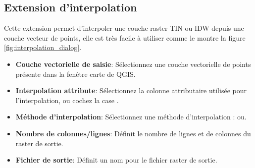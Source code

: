 
%
%

\subsection{Extension d'interpolation}

Cette extension permet d'interpoler une couche raster TIN ou IDW depuis une couche vecteur de points, elle est tr\`es facile \`a utiliser comme le montre la figure \ref{fig:interpolation_dialog}.


\begin{itemize}
\item \textbf{Couche vectorielle de saisie}: S\'electionnez une couche vectorielle de points pr\'esente dans la fen\^etre carte de QGIS.
\item \textbf{Interpolation attribute}: S\'electionnez la colonne attributaire utilis\'ee pour l'interpolation, ou 
cochez la case .
\item \textbf{M\'ethode d'interpolation}: S\'electionnez une m\'ethode d'interpolation :  ou.
\item \textbf{Nombre de colonnes/lignes}: D\'efinit le nombre de lignes et de colonnes du raster de sortie.
\item \textbf{Fichier de sortie}: D\'efinit un nom pour le fichier raster de sortie.
\end{itemize}

